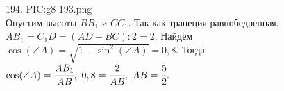 194. {{PIC:g8-193.png}}\\
Опустим высоты $BB_1$ и $CC_1.$ Так как трапеция равнобедренная, $AB_1=C_1D=(AD-BC):2=2.$ Найдём $\cos(\angle A)=\sqrt{1-\sin^2(\angle A)}=0,8.$ Тогда
$\cos(\angle A)=\cfrac{AB_1}{AB},\ 0,8=\cfrac{2}{AB},\ AB=\cfrac{5}{2}.$\\
